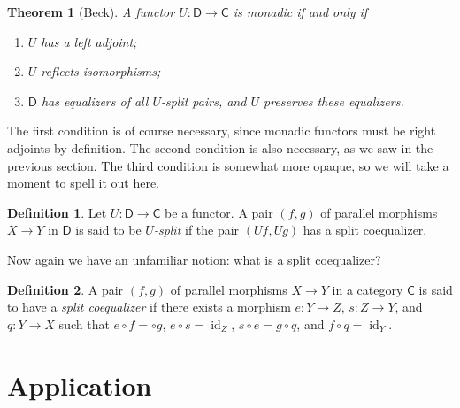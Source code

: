 \documentclass{article}
\newtheorem{thm}{Theorem}
\theoremstyle{definition}
\newtheorem{defn}{Definition}
\newcommand{\C}{\mathsf{C}}
\newcommand{\D}{\mathsf{D}}
\DeclareMathOperator{\id}{id}
\begin{document}
\begin{thm}[Beck]
A functor $U : \D \to \C$ is monadic if and only if
\begin{enumerate}
\item $U$ has a left adjoint;
\item $U$ reflects isomorphisms;
\item $\D$ has equalizers of all $U$-split pairs, and $U$ preserves these equalizers.
\end{enumerate}
\end{thm}

The first condition is of course necessary, since monadic functors must be right adjoints by definition. The second condition is also necessary, as we saw in the previous section. The third condition is somewhat more opaque, so we will take a moment to spell it out here.

\begin{defn}
    Let $U : \D \to \C$ be a functor. A pair $(f,g)$ of parallel morphisms $X \to Y$ in $\D$ is said to be \emph{$U$-split} if the pair $(Uf,Ug)$ has a split coequalizer.
\end{defn}

Now again we have an unfamiliar notion: what is a split coequalizer?

\begin{defn}
    A pair $(f,g)$ of parallel morphisms $X \to Y$ in a category $\C$ is said to have a \emph{split coequalizer} if there exists a morphism $e : Y \to Z$, $s : Z \to Y$, and $q : Y \to X$ such that
    $e \circ f = \circ g$, $e \circ s = \id_Z$, $s \circ e = g \circ q$, and $f \circ q = \id_Y$.
\end{defn}

\section{Application}
\end{document}
